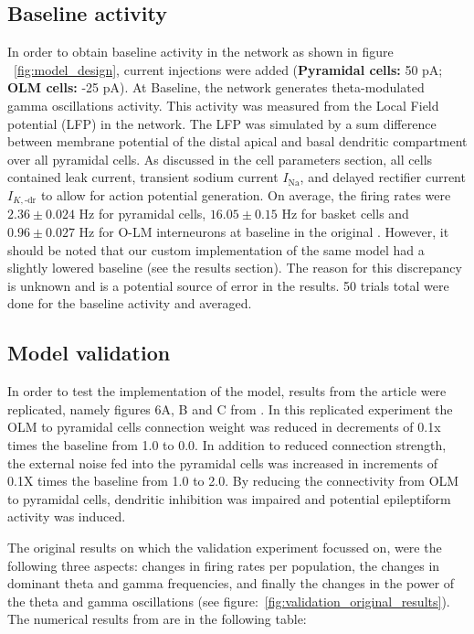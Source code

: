 \subsection{Baseline activity}
In order to obtain baseline activity in the network as shown in figure
~\ref{fig:model_design}, current injections were added (\textbf{Pyramidal
    cells:} 50 pA\@; \textbf{OLM cells:} -25 pA). At Baseline, the network
generates theta-modulated gamma oscillations activity. This activity was
measured from the Local Field potential (LFP) in the network. The LFP was
simulated by a sum difference between membrane potential of the distal apical
and basal dendritic compartment over all pyramidal cells. As discussed in the
cell parameters section, all cells contained leak current, transient sodium
current \(I_{\text{Na}}\), and delayed rectifier current \(I_{K, \text{-}
        \text{dr}}\) to allow for action potential generation. On average, the firing
rates were \(2.36 \pm 0.024\) Hz for pyramidal cells, \(16.05 \pm 0.15\) Hz for
basket cells and \(0.96 \pm 0.027\) Hz for O-LM interneurons at baseline in the
original \parencite{sanjayImpairedDendriticInhibition2015}. However, it should
be noted that our custom implementation of the same model had a slightly
lowered baseline (see the results section). The reason for this discrepancy is
unknown and is a potential source of error in the results. 50 trials total were
done for the baseline activity and averaged.

\subsection{Model validation}
In order to test the implementation of the model, results from the article were
replicated, namely figures 6A, B and C from
\textcite{sanjayImpairedDendriticInhibition2015}. In this replicated experiment
the OLM to pyramidal cells connection weight was reduced in decrements of 0.1x
times the baseline from 1.0 to 0.0. In addition to reduced connection strength,
the external noise fed into the pyramidal cells was increased in increments of
0.1X times the baseline from 1.0 to 2.0. By reducing the connectivity from OLM
to pyramidal cells, dendritic inhibition was impaired and potential
epileptiform activity was induced.

The original results on which the validation experiment focussed on, were the
following three aspects: changes in firing rates per population, the changes in
dominant theta and gamma frequencies, and finally the changes in the power of
the theta and gamma oscillations (see
figure:~\ref{fig:validation_original_results}). The numerical results from are
in the following table:

